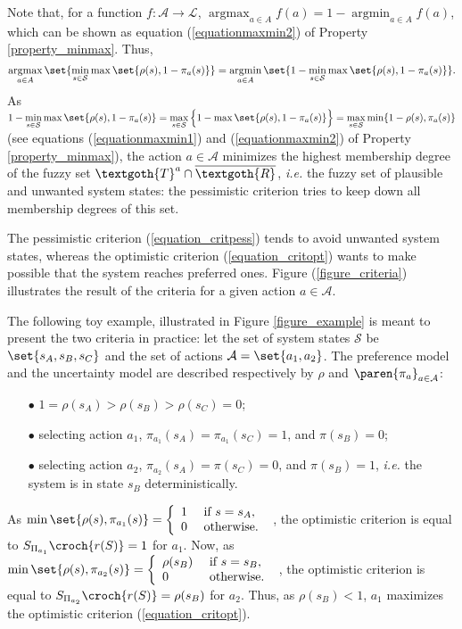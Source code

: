 Note that, for a function $f: \mathcal{A} \rightarrow \mathcal{L}$,
$\operatorname*{argmax}_{a \in A} f(a) = 1 - \operatorname*{argmin}_{a \in A} f(a)$,
which can be shown as equation (\ref{equationmaxmin2}) of Property \ref{property_minmax}.
Thus, 
\[\operatorname*{argmax}_{a \in A} \set{ \displaystyle \min_{s \in  \mathcal{S}} \max\set{ \rho(s),  1- \pi_a(s) } } = \operatorname*{argmin}_{a \in A} \set{ \displaystyle 1 - \min_{s \in \mathcal{S}} \max\set{ \rho(s), 1 - \pi_a(s) } }.\]
As  $1 - \displaystyle \min_{s \in \mathcal{S}} \max\set{ \rho(s), 1 - \pi_a(s) } = \displaystyle \max_{s \in \mathcal{S}} \Big\{ 1 - \max\set{ \rho(s), 1 - \pi_a(s)} \Big\} =  \displaystyle \max_{s \in \mathcal{S}} \min\{ 1-\rho(s), \pi_a(s)  \}$ 
(see equations (\ref{equationmaxmin1}) and (\ref{equationmaxmin2}) of Property \ref{property_minmax}),
the action $a \in \mathcal{A}$ minimizes the highest membership degree 
of the fuzzy set $\textgoth{T}^a \cap \overline{\textgoth{R}}$,
\textit{i.e.} the fuzzy set of plausible and unwanted system states:
the pessimistic criterion tries to keep down all membership degrees of this set. 

The pessimistic criterion (\ref{equation_critpess}) tends to avoid unwanted system states,
whereas the optimistic criterion (\ref{equation_critopt}) wants to make possible 
that the system reaches preferred ones.
Figure (\ref{figure_criteria}) illustrates the result of the criteria for a given action $a\in\mathcal{A}$.

The following toy example, illustrated in Figure \ref{figure_example} 
is meant to present the two criteria in practice:
let the set of system states $\mathcal{S}$ be $\set{ s_A , s_B , s_C }$
and the set of actions $\mathcal{A} = \set{ a_1 , a_2 }$. 
The preference model and the uncertainty model are described respectively by $\rho$ and $\paren{\pi_a}_{a \in \mathcal{A}}$:
\begin{itemize}
\item[$\bullet$] $1 = \rho(s_A) > \rho(s_B) > \rho(s_C) = 0$;
\item[$\bullet$] selecting action $a_1$, $\pi_{a_1}(s_A) = \pi_{a_1}(s_C) = 1$, and $\pi(s_B) = 0$;
\item[$\bullet$] selecting action $a_2$, $\pi_{a_2}(s_A) = \pi(s_C) = 0$, and $\pi(s_B) = 1$, \textit{i.e.}
the system is in state $s_B$ deterministically.
\end{itemize}
As $\min \set{ \rho(s), \pi_{a_1}(s) } = \left \{  \begin{array}{ll}
1 & \mbox{ if } s=s_A, \\
0 & \mbox{ otherwise. }
\end{array} \right.  $,
the optimistic criterion is equal to $S_{\Pi_{a_1}} \croch{ r(S) } = 1$
for $a_1$.
Now, as $\min \set{ \rho(s), \pi_{a_2}(s) } = \left \{  \begin{array}{ll}
\rho(s_B) & \mbox{ if } s=s_B, \\
0 & \mbox{ otherwise. }
\end{array} \right.  $,
the optimistic criterion is equal to $S_{\Pi_{a_2}} \croch{ r(S) } = \rho(s_B)$
for $a_2$. Thus, as $\rho(s_B)<1$, $a_1$ maximizes the optimistic criterion (\ref{equation_critopt}).

